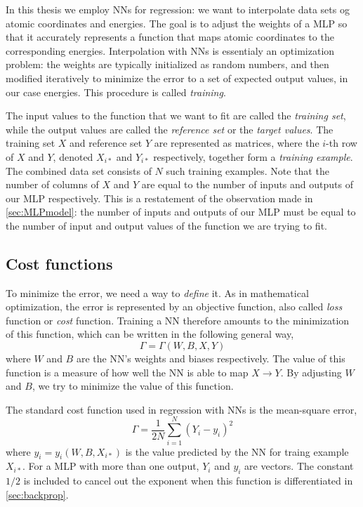 \documentclass[twoside,english]{uiofysmaster}
\begin{document}
In this thesis we employ NNs for regression: we want to interpolate data sets og atomic coordinates and energies.
The goal is to adjust the weights of a MLP so that it accurately represents a function that maps
atomic coordinates to the corresponding energies. Interpolation with NNs is essentialy an optimization problem:
the weights are typically initialized as random numbers, and then modified iteratively to minimize the error
to a set of expected output values, in our case energies. 
This procedure is called \textit{training}. 

The input values to the function that we want to fit
are called the \textit{training set}, while the output values are called the \textit{reference set} or the \textit{target values}.
The training set $X$ and reference set $Y$ are represented as matrices, where the $i$-th row of $X$ and $Y$, 
denoted $X_{i*}$ and $Y_{i*}$ respectively, 
together form a \textit{training example}. The combined data set consists of $N$ such training examples. 
Note that the number of columns of $X$ and $Y$ are equal to the number of inputs and outputs of our MLP respectively. 
This is a restatement of the observation made in \autoref{sec:MLPmodel}: the number of inputs and outputs of our MLP must be equal 
to the number of input and output values of the function we are trying to fit. 


\subsection{Cost functions}
To minimize the error, we need a way to \textit{define} it. 
As in mathematical optimization, the error is represented by an objective function, also called \textit{loss} function
or \textit{cost} function. Training a NN therefore amounts to the minimization of this function, which can be written in the 
following general way,
\begin{equation}
 \Gamma = \Gamma(W, B, X, Y)
 \label{generalCost}
\end{equation}
where $W$ and $B$ are the NN's weights and biases respectively. 
The value of this function is a measure of how well the NN is able to map $X \rightarrow Y$. 
By adjusting $W$ and $B$, we try to minimize the value of this function.  

The standard cost function used in regression with NNs is the mean-square error,
\begin{equation}
 \Gamma = \frac{1}{2N}\sum_{i=1}^N (Y_i - y_i)^2
 \label{quadraticCost}
\end{equation}
where $y_i = y_i(W, B, X_{i*})$ is the value predicted by the NN for traing example $X_{i*}$. 
For a MLP with more than one output, $Y_i$ and $y_i$ are vectors. 
The constant $1/2$ is included to cancel out the exponent when this function is differentiated in \autoref{sec:backprop}.
\end{document}
